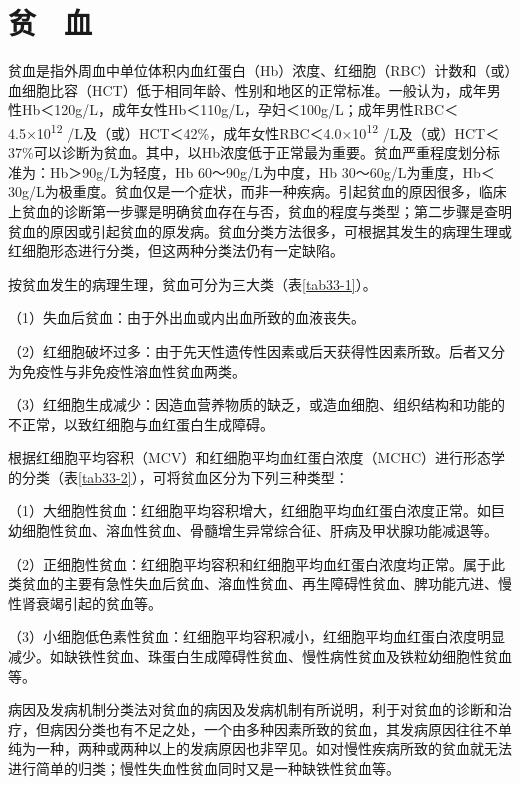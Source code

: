 \chapter{贫　血}

贫血是指外周血中单位体积内血红蛋白（Hb）浓度、红细胞（RBC）计数和（或）血细胞比容（HCT）低于相同年龄、性别和地区的正常标准。一般认为，成年男性Hb＜120g/L，成年女性Hb＜110g/L，孕妇＜100g/L；成年男性RBC＜4.5×10\textsuperscript{12}
/L及（或）HCT＜42\%，成年女性RBC＜4.0×10\textsuperscript{12}
/L及（或）HCT＜37\%可以诊断为贫血。其中，以Hb浓度低于正常最为重要。贫血严重程度划分标准为：Hb＞90g/L为轻度，Hb
60～90g/L为中度，Hb
30～60g/L为重度，Hb＜30g/L为极重度。贫血仅是一个症状，而非一种疾病。引起贫血的原因很多，临床上贫血的诊断第一步骤是明确贫血存在与否，贫血的程度与类型；第二步骤是查明贫血的原因或引起贫血的原发病。贫血分类方法很多，可根据其发生的病理生理或红细胞形态进行分类，但这两种分类法仍有一定缺陷。

按贫血发生的病理生理，贫血可分为三大类（表\ref{tab33-1}）。

（1）失血后贫血：由于外出血或内出血所致的血液丧失。

（2）红细胞破坏过多：由于先天性遗传性因素或后天获得性因素所致。后者又分为免疫性与非免疫性溶血性贫血两类。

（3）红细胞生成减少：因造血营养物质的缺乏，或造血细胞、组织结构和功能的不正常，以致红细胞与血红蛋白生成障碍。

根据红细胞平均容积（MCV）和红细胞平均血红蛋白浓度（MCHC）进行形态学的分类（表\ref{tab33-2}），可将贫血区分为下列三种类型：

（1）大细胞性贫血：红细胞平均容积增大，红细胞平均血红蛋白浓度正常。如巨幼细胞性贫血、溶血性贫血、骨髓增生异常综合征、肝病及甲状腺功能减退等。

（2）正细胞性贫血：红细胞平均容积和红细胞平均血红蛋白浓度均正常。属于此类贫血的主要有急性失血后贫血、溶血性贫血、再生障碍性贫血、脾功能亢进、慢性肾衰竭引起的贫血等。

（3）小细胞低色素性贫血：红细胞平均容积减小，红细胞平均血红蛋白浓度明显减少。如缺铁性贫血、珠蛋白生成障碍性贫血、慢性病性贫血及铁粒幼细胞性贫血等。

病因及发病机制分类法对贫血的病因及发病机制有所说明，利于对贫血的诊断和治疗，但病因分类也有不足之处，一个由多种因素所致的贫血，其发病原因往往不单纯为一种，两种或两种以上的发病原因也非罕见。如对慢性疾病所致的贫血就无法进行简单的归类；慢性失血性贫血同时又是一种缺铁性贫血等。

